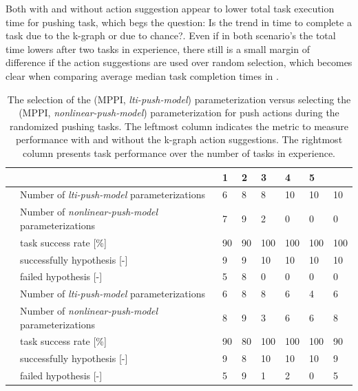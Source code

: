 Both with and without action suggestion appear to lower total task execution time for pushing task, which begs the question: Is the trend in time to complete a task due to the \ac{k-graph} or due to chance?. Even if in both scenario's the total time lowers after two tasks in experience, there still is a small margin of difference if the action suggestions are used over random selection, which becomes clear when comparing average median task completion times in .

\begin{table}[H]
    \caption{The selection of the (\ac{MPPI}, \textit{lti-push-model}) parameterization versus selecting the (\ac{MPPI}, \textit{nonlinear-push-model}) parameterization for push actions during the randomized pushing tasks. The leftmost column indicates the metric to measure performance  with and without the \ac{k-graph} action suggestions. The rightmost column presents task performance over the number of tasks in experience.}
    \label{table:rand_push_model1_vs_model2}
    \centering
    \begin{tabular}%
      {
        >{\raggedright\arraybackslash}p{}
        >{\raggedright\arraybackslash}p{}
      |p{0.4cm}p{0.4cm}p{0.4cm}p{0.4cm}p{0.4cm}p{0.4cm}}
      \multicolumn{2}{c|}{Number of Tasks in experience} &0&1&2&3&4&5\\\toprule
      \multirow{5}{0.1\textwidth}{With \ac{k-graph} suggestions} 
      &Number of \textit{lti-push-model} parameterizations&6&8&8&10&10&10\\
      &Number of \textit{nonlinear-push-model} parameterizations&7&9&2&0&0&0\\
      & task success rate [\%]& 90& 90& 100& 100& 100& 100\\
      & successfully hypothesis [-]& 9& 9& 10& 10& 10& 10\\
      & failed hypothesis [-]& 5& 8& 0& 0& 0& 0\\\midrule
      \multirow{5}{0.1\textwidth}{Without \ac{k-graph} suggestions} 
      &Number of \textit{lti-push-model} parameterizations&6&8&8&6&4&6\\
      &Number of \textit{nonlinear-push-model} parameterizations&8&9&3&6&6&8\\
      & task success rate [\%]& 90& 80& 100& 100& 100& 90\\
      & successfully hypothesis [-]& 9& 8& 10& 10& 10& 9\\
      & failed hypothesis [-]& 5& 9& 1& 2& 0& 5\\
    \end{tabular}
\end{table}

